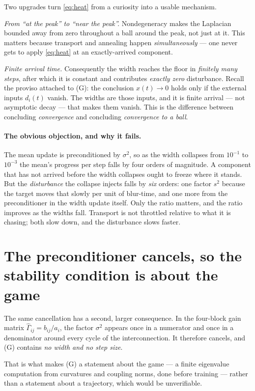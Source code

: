 \documentclass[11pt]{article}
\theoremstyle{definition}
\begin{document}
Two upgrades turn \eqref{eq:heat} from a curiosity into a usable mechanism.

\emph{From ``at the peak'' to ``near the peak''.} Nondegeneracy makes the
Laplacian bounded away from zero throughout a ball around the peak, not just at
it. This matters because transport and annealing happen \emph{simultaneously} ---
one never gets to apply \eqref{eq:heat} at an exactly-arrived component.

\emph{Finite arrival time.} Consequently the width reaches the floor in
\emph{finitely many steps}, after which it is constant and contributes
\emph{exactly zero} disturbance. Recall the proviso attached to (G): the
conclusion $x(t) \to 0$ holds only if the external inputs $d_i(t)$ vanish. The
widths are those inputs, and it is finite arrival --- not asymptotic decay --- that
makes them vanish. This is the difference between concluding \emph{convergence}
and concluding \emph{convergence to a ball}.

\paragraph{The obvious objection, and why it fails.} The mean update is
preconditioned by $\sigma^2$, so as the width collapses from $10^{-1}$ to
$10^{-3}$ the mean's progress per step falls by four orders of magnitude. A
component that has not arrived before the width collapses ought to freeze where it
stands. But the \emph{disturbance} the collapse injects falls by \emph{six}
orders: one factor $s^2$ because the target moves that slowly per unit of
blur-time, and one more from the preconditioner in the width update itself. Only
the ratio matters, and the ratio improves as the widths fall. Transport is not
throttled relative to what it is chasing; both slow down, and the disturbance
slows faster.

\section{The preconditioner cancels, so the stability condition is about the game}

The same cancellation has a second, larger consequence. In the four-block gain
matrix $\hat\Gamma_{ij} = b_{ij}/a_i$, the factor $\sigma^2$ appears once in a
numerator and once in a denominator around every cycle of the interconnection. It
therefore cancels, and (G) contains \emph{no width and no step size}.

That is what makes (G) a statement about the game --- a finite eigenvalue
computation from curvatures and coupling norms, done before training --- rather
than a statement about a trajectory, which would be unverifiable.
\end{document}
